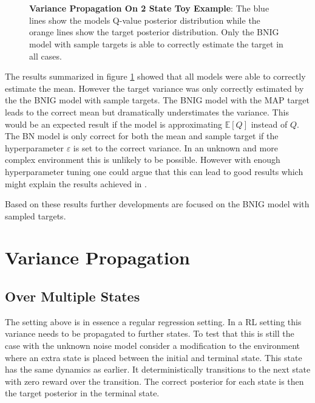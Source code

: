 \begin{figure}[H]
    \centering
    \\
    \\
    \caption{\textbf{Variance Propagation On 2 State Toy Example}: The blue lines show the models Q-value posterior distribution while the orange lines show the target posterior distribution. Only the BNIG model with sample targets is able to correctly estimate the target in all cases.}
    \label{fig:proptest}
\end{figure}

The results summarized in figure \ref{fig:proptest} showed that all models were able to correctly estimate the mean. However the target variance was only correctly estimated by the the BNIG model with sample targets. The BNIG model with the MAP target leads to the correct mean but dramatically understimates the variance. This would be an expected result if the model is approximating $\mathbb{E}[Q]$ instead of $Q$. The BN model is only correct for both the mean and sample target if the hyperparameter $\varepsilon$ is set to the correct variance. In an unknown and more complex environment this is unlikely to be possible. However with enough hyperparameter tuning one could argue that this can lead to good results which might explain the results achieved in \cite{azziz_2018}.

Based on these results further developments are focused on the BNIG model with sampled targets.

\section{Variance Propagation}

\subsection{Over Multiple States}

The setting above is in essence a regular regression setting. In a RL setting this variance needs to be propagated to further states. To test that this is still the case with the unknown noise model consider a modification to the environment where an extra state is placed between the initial and terminal state. This state has the same dynamics as earlier. It deterministically transitions to the next state with zero reward over the transition. The correct posterior for each state is then the target posterior in the terminal state. 

